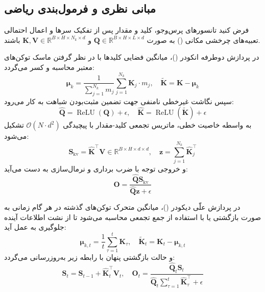 \subsection{مبانی نظری و فرمول‌بندی ریاضی}
فرض کنید تانسورهای پرس‌وجو، کلید و مقدار پس از تفکیک سرها و اعمال احتمالی تعبیه‌های چرخشی مکانی () به صورت $\mathbf{Q} \in \mathbb{R}^{B \times H \times L \times d}$ و $\mathbf{K}, \mathbf{V} \in \mathbb{R}^{B \times H \times N_k \times d}$ باشند. 

در پردازش دوطرفه انکودر ()، میانگین فضایی کلیدها با در نظر گرفتن ماسک توکن‌های معتبر محاسبه و کسر می‌گردد:
\begin{equation}
\boldsymbol{\mu}_k = \frac{1}{\sum_{j=1}^{N_k} m_j} \sum_{j=1}^{N_k} \mathbf{K}_j \cdot m_j, \quad \tilde{\mathbf{K}} = \mathbf{K} - \boldsymbol{\mu}_k
\end{equation}
سپس نگاشت غیرخطی نامنفی جهت تضمین مثبت‌بودن شباهت به کار می‌رود:
\begin{equation}
\hat{\mathbf{Q}} = \operatorname{ReLU}(\mathbf{Q}) + \epsilon, \quad \hat{\mathbf{K}} = \operatorname{ReLU}(\tilde{\mathbf{K}}) + \epsilon
\end{equation}
به واسطه خاصیت خطی، ماتریس تجمعی کلید-مقدار با پیچیدگی $\mathcal{O}(N \cdot d^2)$ تشکیل می‌شود:
\begin{equation}
\mathbf{S}_{\text{kv}} = \hat{\mathbf{K}}^\top \mathbf{V} \in \mathbb{R}^{B \times H \times d \times d}, \quad \mathbf{z} = \sum_{j=1}^{N_k} \hat{\mathbf{K}}_j^\top
\end{equation}
و خروجی توجه با ضرب برداری و نرمال‌سازی به دست می‌آید:
\begin{equation}
\mathbf{O} = \frac{\hat{\mathbf{Q}} \mathbf{S}_{\text{kv}}}{\hat{\mathbf{Q}} \mathbf{z} + \epsilon}
\end{equation}

در پردازش علّی دیکودر ()، میانگین متحرک توکن‌های گذشته در هر گام زمانی به صورت بازگشتی یا با استفاده از جمع تجمعی محاسبه می‌شود تا از نشت اطلاعات آینده جلوگیری به عمل آید:
\begin{equation}
\boldsymbol{\mu}_{k, t} = \frac{1}{t} \sum_{\tau=1}^t \mathbf{K}_\tau, \quad \tilde{\mathbf{K}}_t = \mathbf{K}_t - \boldsymbol{\mu}_{k, t}
\end{equation}
و حالت بازگشتی پنهان با رابطه زیر به‌روزرسانی می‌گردد:
\begin{equation}
\mathbf{S}_t = \mathbf{S}_{t-1} + \hat{\mathbf{K}}_t^\top \mathbf{V}_t, \quad \mathbf{O}_t = \frac{\hat{\mathbf{Q}}_t \mathbf{S}_t}{\hat{\mathbf{Q}}_t \sum_{\tau=1}^t \hat{\mathbf{K}}_\tau^\top + \epsilon}
\end{equation}

